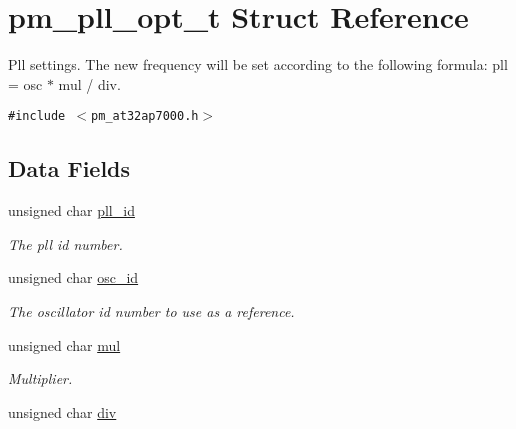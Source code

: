 \hypertarget{structpm__pll__opt__t}{
\section{pm\_\-pll\_\-opt\_\-t Struct Reference}
\label{structpm__pll__opt__t}
}
Pll settings. The new frequency will be set according to the following formula: pll = osc $\ast$ mul / div.  


{\tt \#include $<$pm\_\-at32ap7000.h$>$}

\subsection*{Data Fields}
\begin{CompactItemize}
\item 
\hypertarget{structpm__pll__opt__t_f681a41dae0c61f675cb283f7021a35c}{
unsigned char \hyperlink{structpm__pll__opt__t_f681a41dae0c61f675cb283f7021a35c}{pll\_\-id}}
\label{structpm__pll__opt__t_f681a41dae0c61f675cb283f7021a35c}

\begin{CompactList}\small\item\em The pll id number. \item\end{CompactList}\item 
\hypertarget{structpm__pll__opt__t_d21311786caa8b67229fa8c6f57268d7}{
unsigned char \hyperlink{structpm__pll__opt__t_d21311786caa8b67229fa8c6f57268d7}{osc\_\-id}}
\label{structpm__pll__opt__t_d21311786caa8b67229fa8c6f57268d7}

\begin{CompactList}\small\item\em The oscillator id number to use as a reference. \item\end{CompactList}\item 
\hypertarget{structpm__pll__opt__t_871d632ba4483d6b0410c0cbb62c51ea}{
unsigned char \hyperlink{structpm__pll__opt__t_871d632ba4483d6b0410c0cbb62c51ea}{mul}}
\label{structpm__pll__opt__t_871d632ba4483d6b0410c0cbb62c51ea}

\begin{CompactList}\small\item\em Multiplier. \item\end{CompactList}\item 
\hypertarget{structpm__pll__opt__t_ff3249d14af8fd7c842632c16f227eb9}{
unsigned char \hyperlink{structpm__pll__opt__t_ff3249d14af8fd7c842632c16f227eb9}{div}}
\label{structpm__pll__opt__t_ff3249d14af8fd7c842632c16f227eb9}


\end{CompactItemize}
